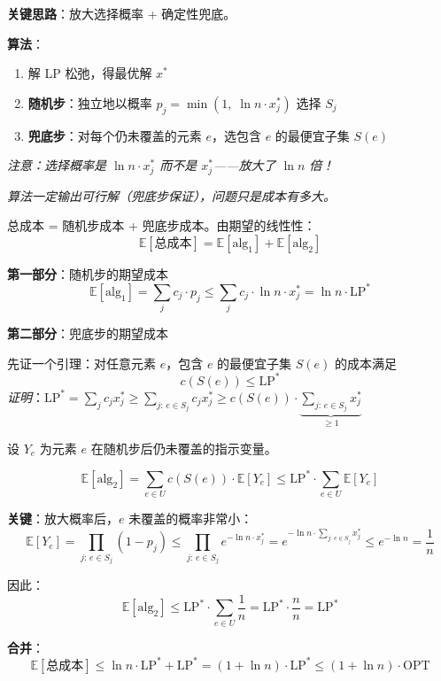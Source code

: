 \documentclass[12pt, a4paper]{ctexart}
\begin{document}
\begin{blackboard}

\textbf{关键思路}：放大选择概率 + 确定性兜底。

\textbf{算法}：
\begin{enumerate}
    \item 解 LP 松弛，得最优解 $x^*$
    \item \textbf{随机步}：独立地以概率 $p_j = \min(1,\; \ln n \cdot x_j^*)$ 选择 $S_j$
    \item \textbf{兜底步}：对每个仍未覆盖的元素 $e$，选包含 $e$ 的最便宜子集 $S(e)$
\end{enumerate}

\textit{注意：选择概率是 $\ln n \cdot x_j^*$ 而不是 $x_j^*$——放大了 $\ln n$ 倍！}

\textit{算法一定输出可行解（兜底步保证），问题只是成本有多大。}

\end{blackboard}

\begin{blackboard}

总成本 = 随机步成本 + 兜底步成本。由期望的线性性：
\[
\mathbb{E}[\text{总成本}] = \mathbb{E}[\text{alg}_1] + \mathbb{E}[\text{alg}_2]
\]

\textbf{第一部分}：随机步的期望成本
\[
\mathbb{E}[\text{alg}_1] = \sum_j c_j \cdot p_j \leq \sum_j c_j \cdot \ln n \cdot x_j^* = \ln n \cdot \text{LP}^*
\]

\textbf{第二部分}：兜底步的期望成本

先证一个引理：对任意元素 $e$，包含 $e$ 的最便宜子集 $S(e)$ 的成本满足
\[
c(S(e)) \leq \text{LP}^*
\]
\textit{证明}：$\text{LP}^* = \sum_j c_j x_j^* \geq \sum_{j:\,e\in S_j} c_j x_j^* \geq c(S(e)) \cdot \underbrace{\sum_{j:\,e\in S_j} x_j^*}_{\geq 1}$

\end{blackboard}

\begin{blackboard}

设 $Y_e$ 为元素 $e$ 在随机步后仍未覆盖的指示变量。

\[
\mathbb{E}[\text{alg}_2] = \sum_{e \in U} c(S(e)) \cdot \mathbb{E}[Y_e] \leq \text{LP}^* \cdot \sum_{e \in U} \mathbb{E}[Y_e]
\]

\textbf{关键}：放大概率后，$e$ 未覆盖的概率非常小：
\[
\mathbb{E}[Y_e] = \prod_{j:\,e\in S_j}(1 - p_j) \leq \prod_{j:\,e\in S_j} e^{-\ln n \cdot x_j^*} = e^{-\ln n \cdot \sum_{j:\,e\in S_j} x_j^*} \leq e^{-\ln n} = \frac{1}{n}
\]

因此：
\[
\mathbb{E}[\text{alg}_2] \leq \text{LP}^* \cdot \sum_{e \in U} \frac{1}{n} = \text{LP}^* \cdot \frac{n}{n} = \text{LP}^*
\]

\textbf{合并}：
\[
\boxed{\mathbb{E}[\text{总成本}] \leq \ln n \cdot \text{LP}^* + \text{LP}^* = (1 + \ln n) \cdot \text{LP}^* \leq (1 + \ln n) \cdot \text{OPT}}
\]

\end{blackboard}
\end{document}
